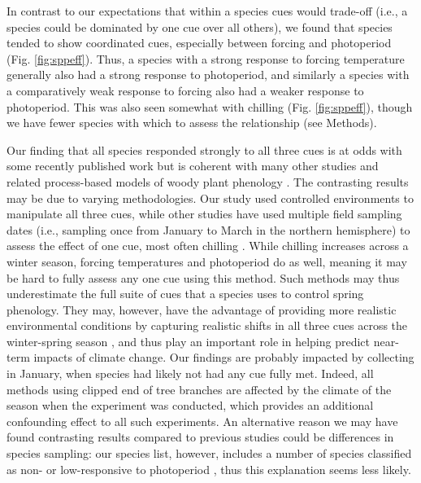 \documentclass[11pt]{article}
\begin{document}
In contrast to our expectations that within a species cues would trade-off (i.e., a species could be dominated by one cue over all others), we found that species tended to show coordinated cues, especially between forcing and photoperiod (Fig. \ref{fig:sppeff}). Thus, a species with a strong response to forcing temperature generally also had a strong response to photoperiod, and similarly a species with a comparatively weak response to forcing also had a weaker response to photoperiod. This was also seen somewhat with chilling (Fig. \ref{fig:sppeff}), though we have fewer species with which to assess the relationship (see Methods). 

Our finding that all species responded strongly to all three cues is at odds with some recently published work \citep{Basler:2012aa,zohner2016ncc} but is coherent with many other studies \citep[e.g.,][]{Worrall:1967aa,Heide:1993b} and related process-based models of woody plant phenology \citep{Chuine:2000,chuine2016}. The contrasting results may be due to varying methodologies. Our study used controlled environments to manipulate all three cues, while other studies have used multiple field sampling dates (i.e., sampling once from January to March in the northern hemisphere) to assess the effect of one cue, most often chilling \citep{weinberger,laube2014gcb,zohner2017}. While chilling increases across a winter season, forcing temperatures and photoperiod do as well, meaning it may be hard to fully assess any one cue using this method. Such methods may thus underestimate the full suite of cues that a species uses to control spring phenology. They may, however, have the advantage of providing more realistic environmental conditions by capturing realistic shifts in all three cues across the winter-spring season \citep{Basler:2012aa}, and thus play an important role in helping predict near-term impacts of climate change. Our findings are probably impacted by collecting in January, when species had likely not had any cue fully met. Indeed, all methods using clipped end of tree branches are affected by the climate of the season when the experiment was conducted, which provides an additional confounding effect to all such experiments. An alternative reason we may have found contrasting results compared to previous studies could be differences in species sampling: our species list, however, includes a number of species classified as non- or low-responsive to photoperiod \citep[i.e., \emph{Alnus incana, Aronia melanocarpa}][]{zohner2016ncc}, thus this explanation seems less likely. 
\end{document}
